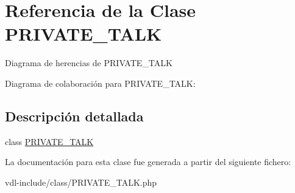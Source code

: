 \hypertarget{class_p_r_i_v_a_t_e___t_a_l_k}{\section{Referencia de la Clase P\-R\-I\-V\-A\-T\-E\-\_\-\-T\-A\-L\-K}
\label{class_p_r_i_v_a_t_e___t_a_l_k}
}


Diagrama de herencias de P\-R\-I\-V\-A\-T\-E\-\_\-\-T\-A\-L\-K


Diagrama de colaboración para P\-R\-I\-V\-A\-T\-E\-\_\-\-T\-A\-L\-K\-:


\subsection{Descripción detallada}
class \hyperlink{class_p_r_i_v_a_t_e___t_a_l_k}{P\-R\-I\-V\-A\-T\-E\-\_\-\-T\-A\-L\-K} 

La documentación para esta clase fue generada a partir del siguiente fichero\-:\begin{DoxyCompactItemize}
\item 
vdl-\/include/class/P\-R\-I\-V\-A\-T\-E\-\_\-\-T\-A\-L\-K.\-php\end{DoxyCompactItemize}
